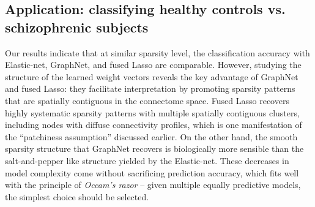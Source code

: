 \subsection{Application: classifying healthy controls vs. schizophrenic subjects}
\label{subsec:disc,real,data}
Our results indicate that at similar sparsity level, the classification accuracy with Elastic-net, GraphNet, and fused Lasso are comparable.
However, studying the structure of the learned weight vectors reveals the key advantage of GraphNet and fused Lasso: they facilitate interpretation by promoting sparsity patterns that are spatially contiguous in the connectome space.
Fused Lasso recovers highly systematic sparsity patterns with multiple spatially contiguous clusters, including nodes with diffuse connectivity profiles, which is one manifestation of the ``patchiness assumption'' discussed earlier.
On the other hand, the smooth sparsity structure that GraphNet recovers is biologically more sensible than the salt-and-pepper like structure yielded by the Elastic-net.
These decreases in model complexity come without sacrificing prediction accuracy, which fits well with the principle of \emph{Occam's razor} -- given multiple equally predictive models, the simplest choice should be selected.

